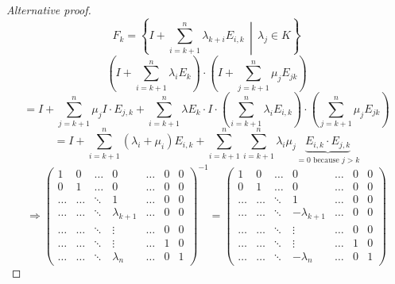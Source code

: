 \documentclass[a4paper,landscape,twocolumn]{article}
\newcommand\setdef[2]{\left\{#1\,\middle|\,#2\right\}}
\begin{document}
\begin{proof}[Alternative proof]
  \[ F_k = \setdef{I + \sum_{i=k+1}^n \lambda_{k+i} E_{i,k}}{\lambda_j \in K} \]
  \[ \left(I + \sum_{i=k+1}^n \lambda_i E_k\right) \cdot \left(I + \sum_{j=k+1}^{n} \mu_j E_{jk}\right) \]
  \[
    = I + \sum_{j=k+1}^{n} \mu_j I \cdot E_{j,k} + \sum_{i=k+1}^n \lambda E_k \cdot I
    \cdot \left(\sum_{i=k+1}^{n} \lambda_i E_{i,k}\right) \cdot
    \left(\sum_{j=k+1}^{n} \mu_j E_{jk}\right)
  \] \[
    = I + \sum_{i=k+1}^n \left(\lambda_i + \mu_i\right) E_{i,k} + \sum_{i=k+1}^n \sum_{i=k+1}^n \lambda_i \mu_j \underbrace{E_{i,k} \cdot E_{j,k}}_{=0 \text{ because } j > k}
  \]
  \[
    \Rightarrow
    \begin{pmatrix}
      1 & 0 & \ldots & 0 & \ldots & 0 & 0 \\
      0 & 1 & \ldots & 0 & \ldots & 0 & 0 \\
      \ldots & \ldots & \ddots & 1 & \ldots & 0 & 0 \\
      \ldots & \ldots & \ddots & \lambda_{k+1} & \ldots & 0 & 0 \\
      \ldots & \ldots & \ddots & \vdots & \ldots & 0 & 0 \\
      \ldots & \ldots & \ddots & \vdots & \ldots & 1 & 0 \\
      \ldots & \ldots & \ddots & \lambda_n & \ldots & 0 & 1
    \end{pmatrix}^{-1}
    =
    \begin{pmatrix}
      1 & 0 & \ldots & 0 & \ldots & 0 & 0 \\
      0 & 1 & \ldots & 0 & \ldots & 0 & 0 \\
      \ldots & \ldots & \ddots & 1 & \ldots & 0 & 0 \\
      \ldots & \ldots & \ddots & -\lambda_{k+1} & \ldots & 0 & 0 \\
      \ldots & \ldots & \ddots & \vdots & \ldots & 0 & 0 \\
      \ldots & \ldots & \ddots & \vdots & \ldots & 1 & 0 \\
      \ldots & \ldots & \ddots & -\lambda_n & \ldots & 0 & 1
    \end{pmatrix}
  \]
\end{proof}
\end{document}
